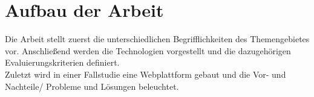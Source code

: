 \section{Aufbau der Arbeit}\label{sec:introduction-structure}
Die Arbeit stellt zuerst die unterschiedlichen Begrifflichkeiten des Themengebietes vor. Anschließend werden die Technologien vorgestellt und die dazugehörigen Evaluierungskriterien definiert. \\
Zuletzt wird in einer Fallstudie eine Webplattform gebaut und die Vor- und Nachteile/ Probleme und Lösungen beleuchtet.
